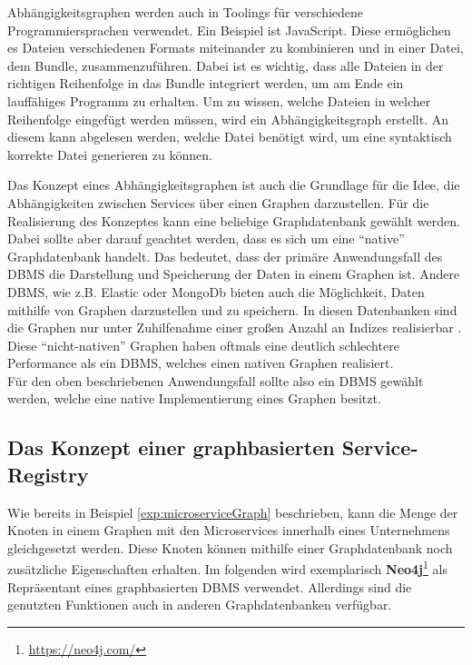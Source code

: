 \begin{example}[Abhängigkeitsgraphen]
	Abhängigkeitsgraphen werden auch in Toolings für verschiedene Programmiersprachen verwendet. Ein Beispiel ist JavaScript. Diese ermöglichen es Dateien verschiedenen Formats miteinander zu kombinieren und in einer Datei, dem Bundle, zusammenzuführen. Dabei ist es wichtig, dass alle Dateien in der richtigen Reihenfolge in das Bundle integriert werden, um am Ende ein lauffähiges Programm zu erhalten. Um zu wissen, welche Dateien in welcher Reihenfolge eingefügt werden müssen, wird ein Abhängigkeitsgraph erstellt. An diesem kann abgelesen werden, welche Datei benötigt wird, um eine syntaktisch korrekte Datei generieren zu können.
\end{example}

Das Konzept eines Abhängigkeitsgraphen ist auch die Grundlage für die Idee, die Abhängigkeiten zwischen Services über einen Graphen darzustellen. Für die Realisierung des Konzeptes kann eine beliebige Graphdatenbank gewählt werden. Dabei sollte aber darauf geachtet werden, dass es sich um eine \enquote{native} Graphdatenbank handelt. Das bedeutet, dass der primäre Anwendungsfall des \ac{DBMS} die Darstellung und Speicherung der Daten in einem Graphen ist. Andere \ac{DBMS}, wie z.B. Elastic oder MongoDb bieten auch die Möglichkeit, Daten mithilfe von Graphen darzustellen und zu speichern. In diesen Datenbanken sind die Graphen nur unter Zuhilfenahme einer großen Anzahl an Indizes realisierbar \autocite{JoyChao2016}. Diese \enquote{nicht-nativen} Graphen haben oftmals eine deutlich schlechtere Performance als ein \ac{DBMS}, welches einen nativen Graphen realisiert.\\
Für den oben beschriebenen Anwendungsfall sollte also ein \ac{DBMS} gewählt werden, welche eine native Implementierung eines Graphen besitzt.

\subsection{Das Konzept einer graphbasierten Service-Registry}

Wie bereits in Beispiel \vref{exp:microserviceGraph} beschrieben, kann die Menge der Knoten in einem Graphen mit den Microservices innerhalb eines Unternehmens gleichgesetzt werden. Diese Knoten können mithilfe einer Graphdatenbank noch zusätzliche Eigenschaften erhalten. Im folgenden wird exemplarisch \textbf{Neo4j}\footnote{\url{https://neo4j.com/}} als Repräsentant eines graphbasierten \ac{DBMS} verwendet. Allerdings sind die genutzten Funktionen auch in anderen Graphdatenbanken verfügbar.


